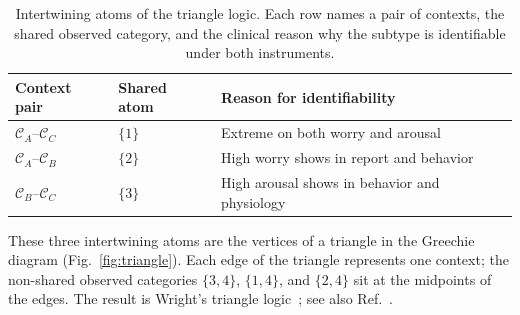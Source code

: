 \documentclass{article}
\providecommand{\colrule}{\hline}
\begin{document}
\begin{table}[htb]
\caption{\label{tab:intertwine_clinical}Intertwining atoms of the
triangle logic. Each row names a pair of contexts, the shared
observed category, and the clinical reason why the subtype is
identifiable under both instruments.}
\begin{center}
\begin{tabular}{lll}
\colrule
Context pair & Shared atom & Reason for identifiability\\
\colrule
$\mathcal{C}_A$--$\mathcal{C}_C$ & $\{1\}$ &
  Extreme on both worry and arousal\\
$\mathcal{C}_A$--$\mathcal{C}_B$ & $\{2\}$ &
  High worry shows in report and behavior\\
$\mathcal{C}_B$--$\mathcal{C}_C$ & $\{3\}$ &
  High arousal shows in behavior and physiology\\
\colrule
\end{tabular}
\end{center}
\end{table}

These three intertwining atoms are the vertices of a triangle in the
Greechie diagram (Fig.~\ref{fig:triangle}). Each edge of the triangle
represents one context; the non-shared observed categories
$\{3,4\}$, $\{1,4\}$, and $\{2,4\}$ sit at the midpoints of the
edges. The result is Wright's triangle logic~\cite[Figure~2,
p.~900]{wright}; see also Ref.~\cite[Fig.~6, Example~8.2,
pp.~414,420,421]{dvur-pul-svo}.
\end{document}
